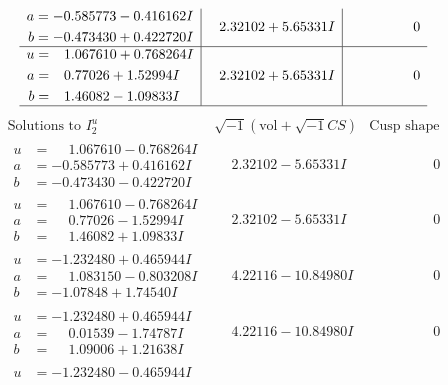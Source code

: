 \documentclass[1p]{elsarticle_modified}
\theoremstyle{definition}
\newcommand{\I}{\sqrt{-1}}
\begin{document}
$$\begin{array}{c|c|c}
\begin{aligned}
a &= -0.585773 - 0.416162 I \\
b &= -0.473430 + 0.422720 I\end{aligned}
 & \phantom{-}2.32102 + 5.65331 I & \phantom{-0.000000 } 0 \\ \hline\begin{aligned}
u &= \phantom{-}1.067610 + 0.768264 I \\
a &= \phantom{-}0.77026 + 1.52994 I \\
b &= \phantom{-}1.46082 - 1.09833 I\end{aligned}
 & \phantom{-}2.32102 + 5.65331 I & \phantom{-0.000000 } 0\\
 \hline 
 \end{array}$$\newpage$$\begin{array}{c|c|c}  
\text{Solutions to }I^u_{2}& \I (\text{vol} + \sqrt{-1}CS) & \text{Cusp shape}\\
 \hline 
\begin{aligned}
u &= \phantom{-}1.067610 - 0.768264 I \\
a &= -0.585773 + 0.416162 I \\
b &= -0.473430 - 0.422720 I\end{aligned}
 & \phantom{-}2.32102 - 5.65331 I & \phantom{-0.000000 } 0 \\ \hline\begin{aligned}
u &= \phantom{-}1.067610 - 0.768264 I \\
a &= \phantom{-}0.77026 - 1.52994 I \\
b &= \phantom{-}1.46082 + 1.09833 I\end{aligned}
 & \phantom{-}2.32102 - 5.65331 I & \phantom{-0.000000 } 0 \\ \hline\begin{aligned}
u &= -1.232480 + 0.465944 I \\
a &= \phantom{-}1.083150 - 0.803208 I \\
b &= -1.07848 + 1.74540 I\end{aligned}
 & \phantom{-}4.22116 - 10.84980 I & \phantom{-0.000000 } 0 \\ \hline\begin{aligned}
u &= -1.232480 + 0.465944 I \\
a &= \phantom{-}0.01539 - 1.74787 I \\
b &= \phantom{-}1.09006 + 1.21638 I\end{aligned}
 & \phantom{-}4.22116 - 10.84980 I & \phantom{-0.000000 } 0 \\ \hline\begin{aligned}
u &= -1.232480 - 0.465944 I \\

\end{aligned}
\end{array}$$
\end{document}
